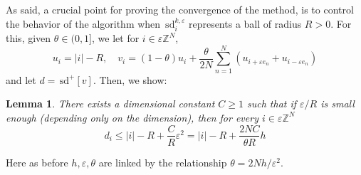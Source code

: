 \documentclass[10pt,a4paper]{amsart}
\newtheorem{lemma}{Lemma}
\newcommand{\Z}{\mathbb{Z}}
\newcommand{\e}{\varepsilon}
\newcommand{\ez}{\e\Z^N}
\newcommand{\sd}{\,\mathrm{sd}}
\begin{document}
As said, a crucial point for proving the convergence of the method, is to control the behavior
of the algorithm when $\sd^{k,\e}_i$ represents a ball of radius $R>0$. For this,
given $\theta\in  {(0,1]}$, we let for $i\in\ez$,
\begin{equation}\label{eq:v}
    u_i= |i|-R,\quad v_i = (1-\theta) u_i + \frac{\theta}{2N} \sum_{n=1}^N (u_{i+\e e_n}+u_{i-\e e_n})   
\end{equation}
and let $d=\sd^+[v]$. Then, we show:
\begin{lemma}\label{lem:balls}
  There exists a dimensional constant $C\ge 1$ such that if $\e/R$ is small enough (depending
  only on the dimension), then for every $i\in\ez$
  \[
    d_i \le |i|-R + \frac{C}{R}\e^2 = |i|-R + \frac{2NC}{\theta R}h  
  \]
\end{lemma}
\noindent Here as before $h,\e,\theta$ are linked by the relationship $\theta=2Nh/\e^2$.
\end{document}
